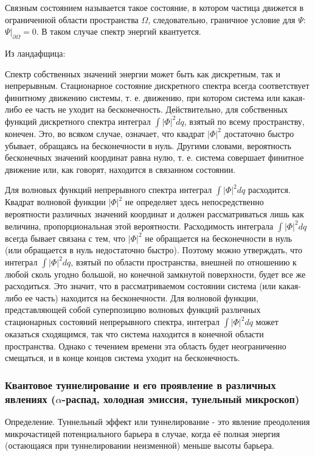 Связным состоянием называется такое состояние, в котором частица движется в ограниченной области
пространства $\Omega$, следовательно, граничное условие для $\Psi$:
$\left. \Psi \right|_{\partial \Omega} = 0$. В таком случае спектр энергий квантуется.

Из ландафщица:

Спектр собственных значений энергии может быть как дискретным, так и непрерывным.
Стационарное состояние дискретного спектра всегда соответствует финитному движению
системы, т. е. движению, при котором система или какая-либо ее часть не уходит на
бесконечность. Действительно, для собственных функций дискретного спектра интеграл
$\int |\Phi|^2 dq$, взятый по всему пространству, конечен. Это, во всяком случае,
означает, что квадрат $|\Phi|^2$ достаточно быстро убывает, обращаясь на бесконечности в
нуль. Другими словами, вероятность бесконечных значений координат равна нулю, т. е.
система совершает финитное движение или, как говорят, находится в связанном состоянии.

Для волновых функций непрерывного спектра интеграл $\int | \Phi |^2 dq$ расходится.
Квадрат волновой функции $|\Phi|^2$ не определяет здесь непосредственно вероятности
различных значений координат и должен рассматриваться лишь как величина, пропорциональная
этой вероятности. Расходимость интеграла $\int | \Phi |^2 dq$ всегда бывает связана с тем,
что $|\Phi|^2$ не обращается на бесконечности в нуль (или обращается в нуль недостаточно
быстро). Поэтому можно утверждать, что интеграл $\int | \Phi |^2 dq$, взятый по
области пространства, внешней по отношению к любой сколь угодно большой, но конечной
замкнутой поверхности, будет все же расходиться. Это значит, что в рассматриваемом
состоянии система (или какая-либо ее часть) находится на бесконечности. Для волновой функции,
представляющей собой суперпозицию волновых функций различных стационарных состояний
непрерывного спектра, интеграл $\int |\Phi|^2 dq$ может оказаться сходящимся, так что
система находится в конечной области пространства. Однако с течением времени эта область
будет неограниченно смещаться, и в конце концов система уходит на бесконечность.


\subsubsection{Квантовое туннелирование и его проявление в различных явлениях ($\alpha$-распад, холодная эмиссия, тунельный микроскоп)}

Определение. Туннельный эффект или туннелирование - это явление преодоления микрочастицей
потенциального барьера в случае, когда её полная энергия (остающаяся при туннелировании
неизменной) меньше высоты барьера.

